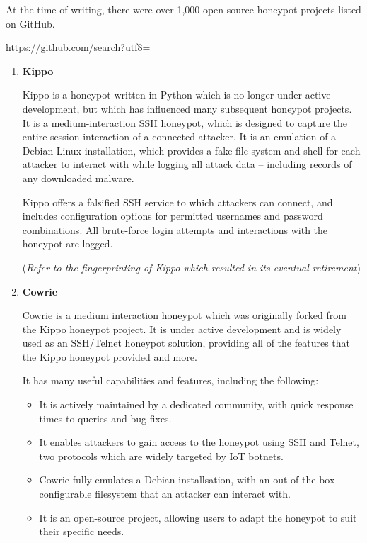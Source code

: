 At the time of writing, there were over 1,000 open-source honeypot projects listed on GitHub. {https://github.com/search?utf8=%

\begin{enumerate}
	
	\item \textbf{Kippo}
	
	Kippo is a honeypot written in Python which is no longer under active development, but which has influenced many subsequent honeypot projects. It is a medium-interaction SSH honeypot, which is designed to capture the entire session interaction of a connected attacker. It is an emulation of a Debian Linux installation, which provides a fake file system and shell for each attacker to interact with while logging all attack data – including records of any downloaded malware. 
	
	Kippo offers a falsified SSH service to which attackers can connect, and includes configuration options for permitted usernames and password combinations. All brute-force login attempts and interactions with the honeypot are logged. 
	
	(\textit{Refer to the fingerprinting of Kippo which resulted in its eventual retirement})
	
	\item \textbf{Cowrie}
	
	Cowrie is a medium interaction honeypot which was originally forked from the Kippo honeypot project. It is under active development and is widely used as an SSH/Telnet honeypot solution, providing all of the features that the Kippo honeypot provided and more. 
	
	It has many useful capabilities and features, including the following:
	
	\begin{itemize}
		\item It is actively maintained by a dedicated community, with quick response times to queries and bug-fixes.
		
		\item It enables attackers to gain access to the honeypot using SSH and Telnet, two protocols which are widely targeted by IoT botnets.
		
		\item Cowrie fully emulates a Debian installsation, with an out-of-the-box configurable filesystem that an attacker can interact with.
		
		\item It is an open-source project, allowing users to adapt the honeypot to suit their specific needs.
		

\end{itemize}
\end{enumerate}}
